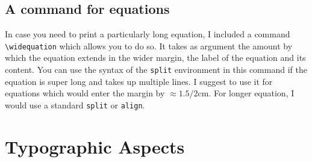 \subsection{A command for equations}

In case you need to print a particularly long equation, I included a command \texttt{{\textbackslash}widequation} which allows you to do so. It takes as argument the amount by which the equation extends in the wider margin, the label of the equation and its content. You can use the syntax of the \texttt{split} environment in this command if the equation is super long and takes up multiple lines. I suggest to use it for equations which would enter the margin by $\approx 1.5/2$cm. For longer equation, I would use a standard \texttt{split} or \texttt{align}.

\section{Typographic Aspects}

